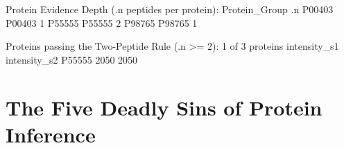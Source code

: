 \documentclass[11pt,twoside,openright]{book}
\begin{document}
\begin{routput}
Protein Evidence Depth (.n peptides per protein):
       Protein\_Group .n
P00403        P00403  1
P55555        P55555  2
P98765        P98765  1

Proteins passing the Two-Peptide Rule (.n >= 2): 1 of 3 proteins
       intensity\_s1 intensity\_s2
P55555         2050         2050
\end{routput}

\section{The Five Deadly Sins of Protein Inference}
\end{document}
